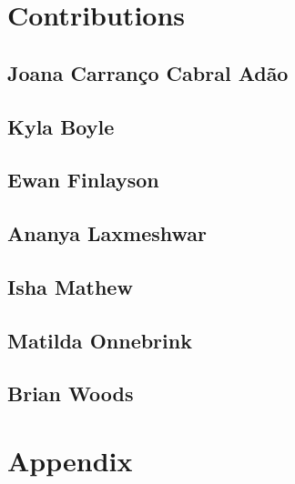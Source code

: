 \documentclass[12pt]{article}
\begin{document}

 \label{sec:ref}

\vspace{1.5cm}

\section*{Contributions}

\subsection*{Joana Carranço Cabral Adão}


\subsection*{Kyla Boyle}


\subsection*{Ewan Finlayson}


\subsection*{Ananya Laxmeshwar}


\subsection*{Isha Mathew}


\subsection*{Matilda Onnebrink}


\subsection*{Brian Woods}


\listoffigures

\listoftables

\section*{Appendix}
\end{document}
